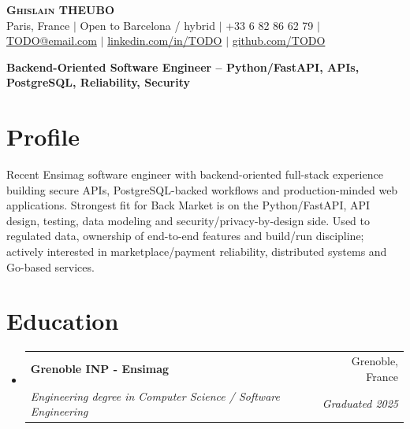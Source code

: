 \documentclass[letterpaper,11pt]{article}
\makeatletter
\newcommand{\resumeSubheading}[4]{
  \vspace{-2pt}\item
    \begin{tabular*}{0.97\textwidth}[t]{l@{\extracolsep{\fill}}r}
      \textbf{#1} & #2 \\
      \textit{\small#3} & \textit{\small #4} \\
    \end{tabular*}\vspace{-7pt}
}
\newcommand{\resumeSubHeadingListStart}{\begin{itemize}[leftmargin=0.15in, label={}]}
\newcommand{\resumeSubHeadingListEnd}{\end{itemize}}
\makeatother
\begin{document}
\begin{center}
    \textbf{\Huge \scshape Ghislain THEUBO} \\ \vspace{2pt}
    \small Paris, France $|$ Open to Barcelona / hybrid $|$ +33 6 82 86 62 79 $|$
    \href{mailto:TODO@email.com}{TODO@email.com} $|$
    \href{https://www.linkedin.com/in/TODO}{linkedin.com/in/TODO} $|$
    \href{https://github.com/TODO}{github.com/TODO}
\end{center}

\vspace{-8pt}
\begin{center}
    \textbf{Backend-Oriented Software Engineer -- Python/FastAPI, APIs, PostgreSQL, Reliability, Security}
\end{center}
\vspace{-8pt}

\section{Profile}
\small{
Recent Ensimag software engineer with backend-oriented full-stack experience building secure APIs, PostgreSQL-backed workflows and production-minded web applications. Strongest fit for Back Market is on the Python/FastAPI, API design, testing, data modeling and security/privacy-by-design side. Used to regulated data, ownership of end-to-end features and build/run discipline; actively interested in marketplace/payment reliability, distributed systems and Go-based services.
}

\section{Education}
\resumeSubHeadingListStart
  \resumeSubheading
    {Grenoble INP - Ensimag}{Grenoble, France}
    {Engineering degree in Computer Science / Software Engineering}{Graduated 2025}
\resumeSubHeadingListEnd
\end{document}
